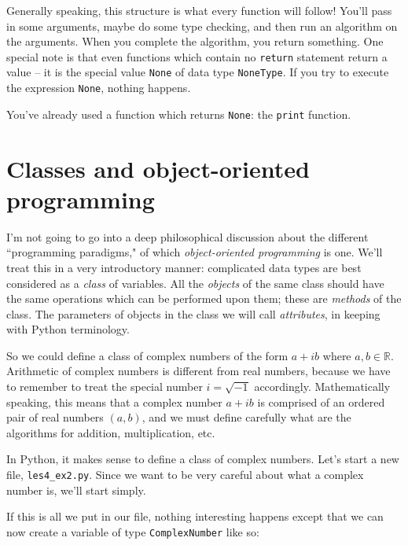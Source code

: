 \documentclass[m3380-lec-main.tex]{subfiles}
\begin{document}
Generally speaking, this structure is what every function will follow! You'll pass in some arguments, maybe do some type checking, and then run an algorithm on the arguments. When you complete the algorithm, you return something. One special note is that even functions which contain no \verb|return| statement return a value -- it is the special value \verb|None| of data type \verb|NoneType|. If you try to execute the expression \verb|None|, nothing happens.

\smallskip\noindent
You've already used a function which returns \verb|None|: the \verb|print| function.

\smallskip\noindent

\section{Classes and object-oriented programming}

I'm not going to go into a deep philosophical discussion about the different ``programming paradigms," of which \emph{object-oriented programming} is one. We'll treat this in a very introductory manner: complicated data types are best considered as a \emph{class} of variables. All the \emph{objects} of the same class should have the same operations which can be performed upon them; these are \emph{methods} of the class. The parameters of objects in the class we will call \emph{attributes}, in keeping with Python terminology.

So we could define a class of complex numbers of the form $a+i b$ where $a,b\in \mathbb{R}$. Arithmetic of complex numbers is different from real numbers, because we have to remember to treat the special number $i=\sqrt{-1}$ accordingly. Mathematically speaking, this means that a complex number $a+ib$ is comprised of an ordered pair of real numbers $(a,b)$, and we must define carefully what are the algorithms for addition, multiplication, etc.

In Python, it makes sense to define a class of complex numbers. Let's start a new file, \verb|les4_ex2.py|. Since we want to be very careful about what a complex number is, we'll start simply.

\smallskip\noindent
If this is all we put in our file, nothing interesting happens except that we can now create a variable of type \verb|ComplexNumber| like so:
\end{document}
